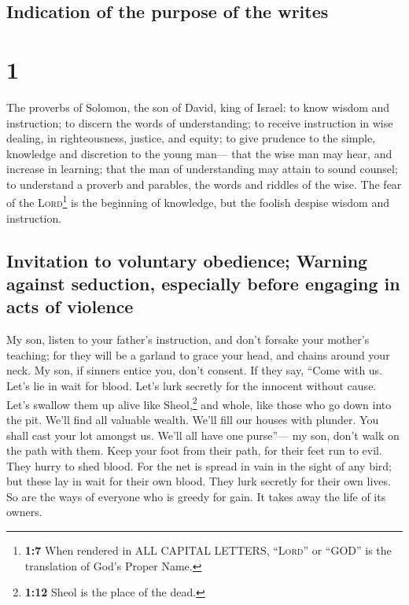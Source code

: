 \hypertarget{indication-of-the-purpose-of-the-writes}{%
\subsection{Indication of the purpose of the
writes}\label{indication-of-the-purpose-of-the-writes}}

\hypertarget{section}{%
\section{1}\label{section}}

 The proverbs of Solomon, the son of David, king of
Israel:  to know wisdom and instruction; to discern the
words of understanding;  to receive instruction in wise
dealing, in righteousness, justice, and equity;  to give
prudence to the simple, knowledge and discretion to the young man---
 that the wise man may hear, and increase in learning;
that the man of understanding may attain to sound counsel;
 to understand a proverb and parables, the words and
riddles of the wise.  The fear of the
\textsc{Lord}\footnote{\textbf{1:7} When rendered in ALL CAPITAL
  LETTERS, ``\textsc{Lord}'' or ``GOD'' is the translation of God's
  Proper Name.} is the beginning of knowledge, but the foolish despise
wisdom and instruction.

\hypertarget{invitation-to-voluntary-obedience-warning-against-seduction-especially-before-engaging-in-acts-of-violence}{%
\subsection{Invitation to voluntary obedience; Warning against
seduction, especially before engaging in acts of
violence}\label{invitation-to-voluntary-obedience-warning-against-seduction-especially-before-engaging-in-acts-of-violence}}

 My son, listen to your father's instruction, and don't
forsake your mother's teaching;  for they will be a
garland to grace your head, and chains around your neck. 
My son, if sinners entice you, don't consent.  If they
say, ``Come with us. Let's lie in wait for blood. Let's lurk secretly
for the innocent without cause.  Let's swallow them up
alive like Sheol,\footnote{\textbf{1:12} Sheol is the place of the dead.}
and whole, like those who go down into the pit.  We'll
find all valuable wealth. We'll fill our houses with plunder.
 You shall cast your lot amongst us. We'll all have one
purse''---  my son, don't walk on the path with them.
Keep your foot from their path,  for their feet run to
evil. They hurry to shed blood.  For the net is spread in
vain in the sight of any bird;  but these lay in wait for
their own blood. They lurk secretly for their own lives. 
So are the ways of everyone who is greedy for gain. It takes away the
life of its owners.

